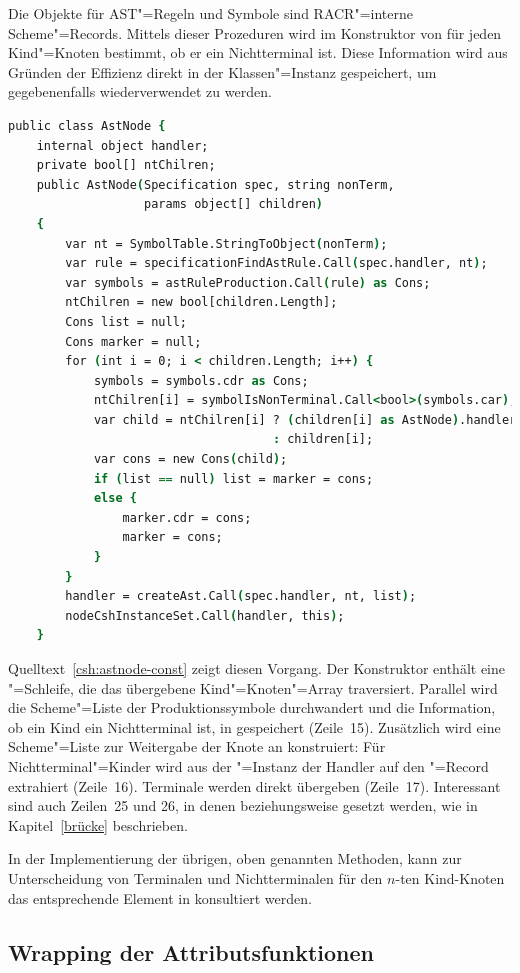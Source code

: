 Die Objekte für AST"=Regeln und Symbole sind RACR"=interne Scheme"=Records. Mittels dieser Prozeduren wird im Konstruktor von  für jeden Kind"=Knoten bestimmt, ob er ein Nichtterminal ist. Diese Information wird aus Gründen der Effizienz direkt in der Klassen"=Instanz gespeichert, um gegebenenfalls wiederverwendet zu werden.

\begin{lstlisting}[language=csh, caption={Initialisierungen im Konstruktor von \csh{Racr.AstNode}}, label=csh:astnode-const]
public class AstNode {
	internal object handler;
	private bool[] ntChilren;
	public AstNode(Specification spec, string nonTerm,
				   params object[] children)
	{
		var nt = SymbolTable.StringToObject(nonTerm);
		var rule = specificationFindAstRule.Call(spec.handler, nt);
		var symbols = astRuleProduction.Call(rule) as Cons;
		ntChilren = new bool[children.Length];
		Cons list = null;
		Cons marker = null;
		for (int i = 0; i < children.Length; i++) {
			symbols = symbols.cdr as Cons;
			ntChilren[i] = symbolIsNonTerminal.Call<bool>(symbols.car);
			var child = ntChilren[i] ? (children[i] as AstNode).handler
									 : children[i];
			var cons = new Cons(child);
			if (list == null) list = marker = cons;
			else {
				marker.cdr = cons;
				marker = cons;
			}
		}
		handler = createAst.Call(spec.handler, nt, list);
		nodeCshInstanceSet.Call(handler, this);
	}
\end{lstlisting}

Quelltext~\ref{csh:astnode-const} zeigt diesen Vorgang. Der Konstruktor enthält eine "=Schleife, die das übergebene Kind"=Knoten"=Array traversiert. Parallel wird die Scheme"=Liste der Produktionssymbole durchwandert und die Information, ob ein Kind ein Nichtterminal ist, in  gespeichert (Zeile~15). Zusätzlich wird eine Scheme"=Liste zur Weitergabe der Knote an  konstruiert: Für Nichtterminal"=Kinder wird aus der "=Instanz der Handler auf den "=Record extrahiert (Zeile~16). Terminale werden direkt übergeben (Zeile~17). Interessant sind auch Zeilen~25 und 26, in denen  beziehungsweise  gesetzt werden, wie in Kapitel~\ref{brücke} beschrieben.

In der Implementierung der übrigen, oben genannten Methoden, kann zur Unterscheidung von Terminalen und Nichtterminalen für den $n$-ten Kind-Knoten das entsprechende Element in  konsultiert werden.

\subsection{Wrapping der Attributsfunktionen}

